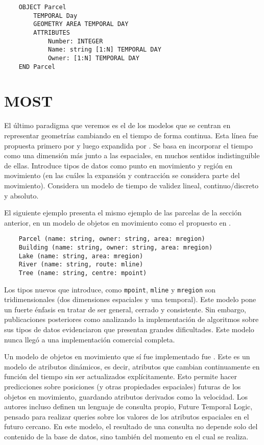 \begin{verbatim}
    OBJECT Parcel
        TEMPORAL Day
        GEOMETRY AREA TEMPORAL DAY
        ATTRIBUTES
            Number: INTEGER
            Name: string [1:N] TEMPORAL DAY
            Owner: [1:N] TEMPORAL DAY
    END Parcel
\end{verbatim}


\section{MOST}

El último paradigma que veremos es el de los modelos que se centran en representar geometrías cambiando en el tiempo de forma continua. Esta línea fue propuesta primero por \cite{sp:moving} y luego expandida por \cite{sp:moving2}. Se basa en incorporar el tiempo como una dimensión más junto a las espaciales, en muchos sentidos indistinguible de ellas.
Introduce tipos de datos como punto en movimiento y región en movimiento (en las cuáles la expansión y contracción se considera parte del movimiento). Considera un modelo de tiempo de validez lineal, continuo/discreto y absoluto.

El siguiente ejemplo presenta el mismo ejemplo de las parcelas de la sección anterior, en un modelo de objetos en movimiento como el propuesto en \cite{sp:moving2}.

\begin{verbatim}
    Parcel (name: string, owner: string, area: mregion)
    Building (name: string, owner: string, area: mregion)
    Lake (name: string, area: mregion)
    River (name: string, route: mline)
    Tree (name: string, centre: mpoint)
\end{verbatim}

Los tipos nuevos que introduce, como \texttt{mpoint}, \texttt{mline} y \texttt{mregion} son tridimensionales (dos dimensiones espaciales y una temporal). Este modelo pone un fuerte énfasis en tratar de ser general, cerrado y consistente. Sin embargo, publicaciones posteriores como \cite{sp:moving3} analizando la implementación de algoritmos sobre sus tipos de datos evidenciaron que presentan grandes dificultades. Este modelo nunca llegó a una implementación comercial completa.

Un modelo de objetos en movimiento que sí fue implementado fue \textsuperscript{\cite{sp:most}}. Este es un modelo de atributos dinámicos, es decir, atributos que cambian continuamente en función del tiempo sin ser actualizados explícitamente. Esto permite hacer predicciones sobre posiciones (y otras propiedades espaciales) futuras de los objetos en movimiento, guardando atributos derivados como la velocidad. Los autores incluso definen un lenguaje de consulta propio, Future Temporal Logic, pensado para realizar queries sobre los valores de los atributos espaciales en el futuro cercano.
En este modelo, el resultado de una consulta no depende solo del contenido de la base de datos, sino también del momento en el cual se realiza.

